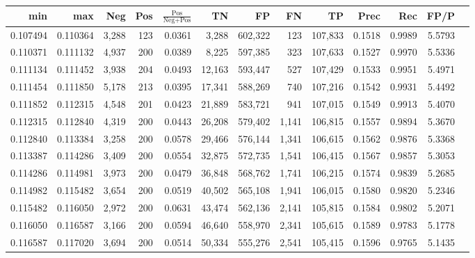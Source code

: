 \begin{tabular}{rrrrrrrrrrrrr}
\toprule
     min &      max &   Neg & Pos & $\frac{\text{Pos}}{\text{Neg}+\text{Pos}}$ &      TN &      FP &      FN &      TP &   Prec &    Rec &   FP/P \\
\midrule
0.107494 & 0.110364 & 3,288 & 123 &                                     0.0361 &   3,288 & 602,322 &     123 & 107,833 & 0.1518 & 0.9989 & 5.5793 \\
0.110371 & 0.111132 & 4,937 & 200 &                                     0.0389 &   8,225 & 597,385 &     323 & 107,633 & 0.1527 & 0.9970 & 5.5336 \\
0.111134 & 0.111452 & 3,938 & 204 &                                     0.0493 &  12,163 & 593,447 &     527 & 107,429 & 0.1533 & 0.9951 & 5.4971 \\
0.111454 & 0.111850 & 5,178 & 213 &                                     0.0395 &  17,341 & 588,269 &     740 & 107,216 & 0.1542 & 0.9931 & 5.4492 \\
0.111852 & 0.112315 & 4,548 & 201 &                                     0.0423 &  21,889 & 583,721 &     941 & 107,015 & 0.1549 & 0.9913 & 5.4070 \\
0.112315 & 0.112840 & 4,319 & 200 &                                     0.0443 &  26,208 & 579,402 &   1,141 & 106,815 & 0.1557 & 0.9894 & 5.3670 \\
0.112840 & 0.113384 & 3,258 & 200 &                                     0.0578 &  29,466 & 576,144 &   1,341 & 106,615 & 0.1562 & 0.9876 & 5.3368 \\
0.113387 & 0.114286 & 3,409 & 200 &                                     0.0554 &  32,875 & 572,735 &   1,541 & 106,415 & 0.1567 & 0.9857 & 5.3053 \\
0.114286 & 0.114981 & 3,973 & 200 &                                     0.0479 &  36,848 & 568,762 &   1,741 & 106,215 & 0.1574 & 0.9839 & 5.2685 \\
0.114982 & 0.115482 & 3,654 & 200 &                                     0.0519 &  40,502 & 565,108 &   1,941 & 106,015 & 0.1580 & 0.9820 & 5.2346 \\
0.115482 & 0.116050 & 2,972 & 200 &                                     0.0631 &  43,474 & 562,136 &   2,141 & 105,815 & 0.1584 & 0.9802 & 5.2071 \\
0.116050 & 0.116587 & 3,166 & 200 &                                     0.0594 &  46,640 & 558,970 &   2,341 & 105,615 & 0.1589 & 0.9783 & 5.1778 \\
0.116587 & 0.117020 & 3,694 & 200 &                                     0.0514 &  50,334 & 555,276 &   2,541 & 105,415 & 0.1596 & 0.9765 & 5.1435 \\

\end{tabular}
